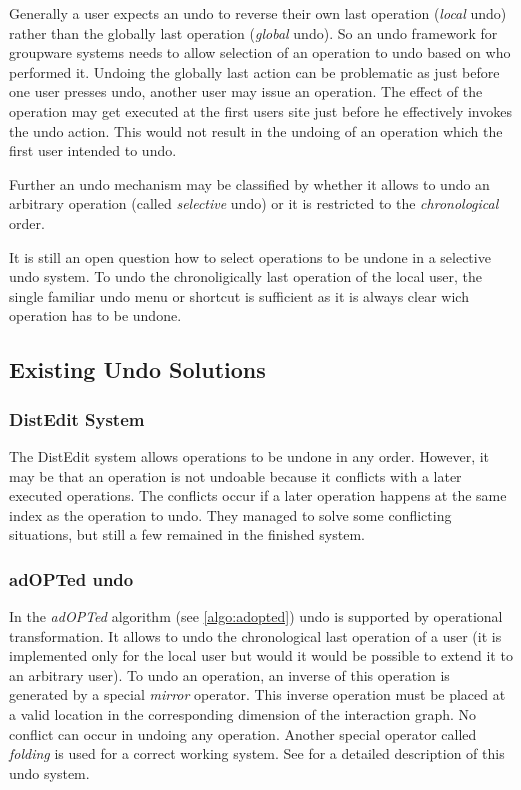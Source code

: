 Generally a user expects an undo to reverse their own last operation (\emph{local} undo) rather than the globally last operation (\emph{global} undo). So an undo framework for groupware systems needs to allow selection of an operation to undo based on who performed it. Undoing the globally last action can be problematic as just before one user presses undo, another user may issue an operation. The effect of the operation may get executed at the first users site just before he effectively invokes the undo action. This would not result in the undoing of an operation which the first user intended to undo.

Further an undo mechanism may be classified by whether it allows to undo an arbitrary operation (called \emph{selective} undo) or it is restricted to the \emph{chronological} order.

It is still an open question how to select operations to be undone in a selective undo system. To undo the chronoligically last operation of the local user, the single familiar undo menu or shortcut is sufficient as it is always clear wich operation has to be undone.


\subsection{Existing Undo Solutions}

\subsubsection{DistEdit System}
The DistEdit system \cite{prakash94} allows operations to be undone in any order. However, it may be that an operation is not undoable because it conflicts with a later executed operations. The conflicts occur if a later operation happens at the same index as the operation to undo. They managed to solve some conflicting situations, but still a few remained in the finished system.

\subsubsection{adOPTed undo}
In the \emph{adOPTed} algorithm (see \ref{algo:adopted}) undo is supported by operational transformation. It allows to undo the chronological last operation of a user (it is implemented only for the local user but would it would be possible to extend it to an arbitrary user). To undo an operation, an inverse of this operation is generated by a special \emph{mirror} operator. This inverse operation must be placed at a valid location in the corresponding dimension of the interaction graph. No conflict can occur in undoing any operation. Another special operator called \emph{folding} is used for a correct working system. See \cite{ressel99} for a detailed description of this undo system.

